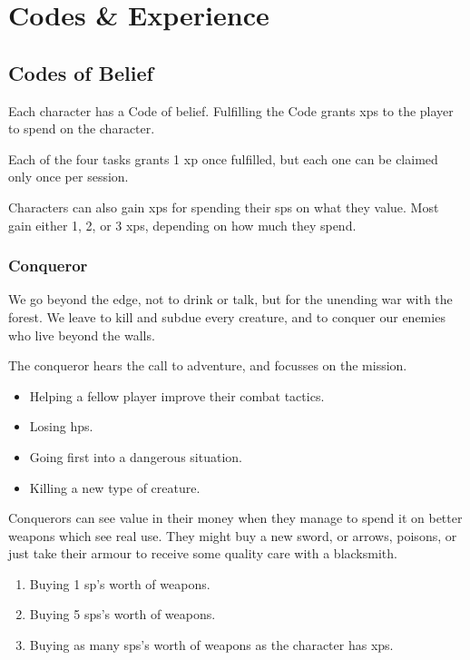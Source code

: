 \chapter[The Soldier's Code]{Codes \& Experience}
\label{codes}

\section{Codes of Belief}
\label{listOfCodes}

\begin{multicols}{2}
\noindent
Each character has a Code of belief.
Fulfilling the Code grants \glspl{xp} to the player to spend on the character.

Each of the four tasks grants 1 \gls{xp} once fulfilled, but each one can be claimed only once per session.

Characters can also gain \glspl{xp} for spending their \glspl{sp} on what they value.
Most gain either 1, 2, or 3 \glspl{xp}, depending on how much they spend.

\subsection{Conqueror}

We go beyond the \gls{edge}, not to drink or talk, but for the unending war with the forest.
We leave to kill and subdue every creature, and to conquer our enemies who live beyond the walls.

The conqueror hears the call to adventure, and focusses on the mission.

\begin{itemize}

  \item
  Helping a fellow player improve their combat tactics.
  \item
  Losing \glspl{hp}.
  \item
  Going first into a dangerous situation.
  \item
  Killing a new type of creature.

\end{itemize}

Conquerors can see value in their money when they manage to spend it on better weapons which see real use.
They might buy a new sword, or arrows, poisons, or just take their armour to receive some quality care with a blacksmith.

\begin{enumerate}
  \item
  Buying 1 \gls{sp}'s worth of weapons.
  \item
  Buying 5 \glspl{sp}'s worth of weapons.
  \item
  Buying as many \glspl{sp}'s worth of weapons as the character has \glspl{xp}.
\end{enumerate}


\end{multicols}
